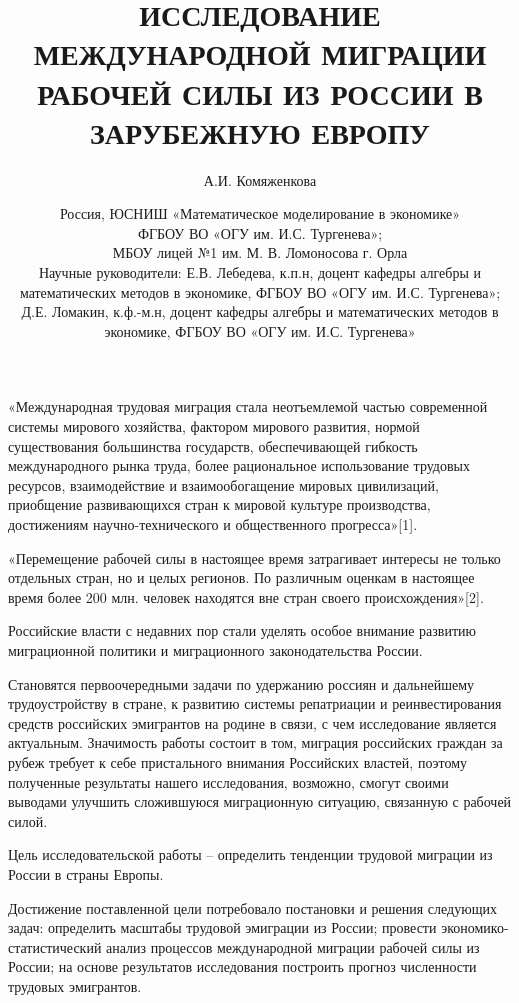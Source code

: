 \documentclass{article}
\begin{document}
\title {ИССЛЕДОВАНИЕ МЕЖДУНАРОДНОЙ МИГРАЦИИ РАБОЧЕЙ СИЛЫ ИЗ РОССИИ В ЗАРУБЕЖНУЮ ЕВРОПУ}
\author{А.И. Комяженкова}
\date{Россия, ЮСНИШ «Математическое моделирование в экономике» \\
ФГБОУ ВО «ОГУ им. И.С. Тургенева»; \\
МБОУ лицей №1 им. М. В. Ломоносова г. Орла \\
Научные руководители: Е.В. Лебедева, к.п.н, доцент кафедры алгебры и математических методов в экономике, ФГБОУ ВО «ОГУ им. И.С. Тургенева»; \\
Д.Е. Ломакин, к.ф.-м.н, доцент кафедры алгебры и математических методов в экономике, ФГБОУ ВО «ОГУ им. И.С. Тургенева»}

\maketitle

«Международная трудовая миграция стала неотъемлемой частью современной системы мирового хозяйства, фактором мирового развития, нормой существования большинства государств, обеспечивающей гибкость международного рынка труда, более рациональное использование трудовых ресурсов, взаимодействие и взаимообогащение мировых цивилизаций, приобщение развивающихся стран к мировой культуре производства, достижениям научно-технического и общественного прогресса»[1].

«Перемещение рабочей силы в настоящее время затрагивает интересы не только отдельных стран, но и целых регионов. По различным оценкам в настоящее время более 200 млн. человек находятся вне стран своего происхождения»[2].

Российские власти с недавних пор стали уделять особое внимание развитию миграционной политики и миграционного законодательства России.

Становятся первоочередными задачи по удержанию россиян и дальнейшему трудоустройству в стране, к развитию системы репатриации и реинвестирования средств российских эмигрантов на родине в связи, с чем исследование является актуальным. Значимость работы состоит в том, миграция российских граждан за рубеж требует к себе пристального внимания Российских властей, поэтому полученные результаты нашего исследования, возможно, смогут своими выводами улучшить сложившуюся миграционную ситуацию, связанную с рабочей силой.

Цель исследовательской работы -- определить тенденции трудовой миграции из России в страны Европы.

Достижение поставленной цели потребовало постановки и решения следующих задач: определить масштабы трудовой эмиграции из России; провести экономико-статистический анализ процессов международной миграции рабочей силы из России; на основе результатов исследования построить прогноз численности трудовых эмигрантов.
\end{document}
